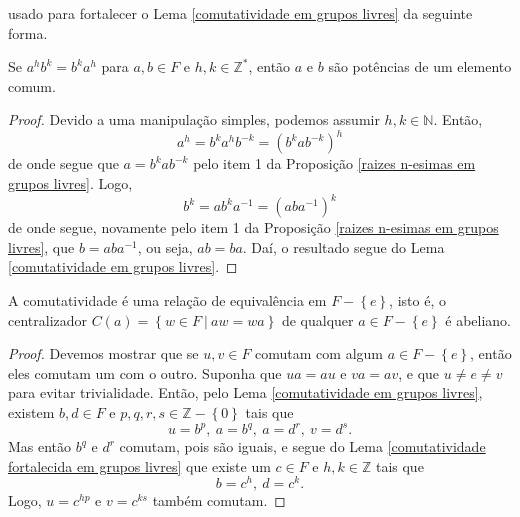     	usado para fortalecer o Lema \ref{comutatividade em grupos livres} da seguinte forma.
    	\begin{lemma}
    	\label{comutatividade fortalecida em grupos livres}
    		Se $a^hb^k = b^ka^h$ para $a,b\in F$ e $h,k\in\mathbb{Z}^\ast$, então $a$ e $b$ são potências 
    		de um elemento comum.
    	\end{lemma}
    	\begin{proof}
    		Devido a uma manipulação simples, podemos assumir $h,k\in\mathbb{N}$. Então,
    		\begin{equation*}
    		    a^h = b^ka^hb^{-k} = (b^kab^{-k})^h
    		\end{equation*}
    		de onde segue que $a = b^kab^{-k}$ pelo item 1 da 
    		Proposição \ref{raizes n-esimas em grupos livres}. Logo,
    		\begin{equation*}
    		    b^k = ab^ka^{-1} = (aba^{-1})^k
    		\end{equation*}
    		de onde segue, novamente pelo item 1 da 
    		Proposição \ref{raizes n-esimas em grupos livres}, que $b = aba^{-1}$, ou seja, $ab = ba$. 
    		Daí, o resultado segue do Lema \ref{comutatividade em grupos livres}.
    	\end{proof}
    	\begin{prop}
    	\label{comutatividade e relacao de equivalencia em grupos livres}
    		A comutatividade é uma relação de equivalência em $F - \left\{ e \right\}$, isto é, o 
    		centralizador $C(a) = \left\{ w\in F \ \vert \ aw = wa \right\}$ de qualquer 
    		$a\in F - \left\{e\right\}$ é abeliano.
    	\end{prop}
    	\begin{proof}
    		Devemos mostrar que se $u,v\in F$ comutam com algum $a\in F - \left\{ e \right\}$, então 
    		eles comutam um com o outro. Suponha que $ua=au$ e $va = av$, e que $u\neq e\neq v$ para evitar
    		trivialidade. Então, pelo Lema \ref{comutatividade em grupos livres}, existem $b,d\in F$ e
    		$p,q,r,s\in\mathbb{Z} - \left\{0\right\}$ tais que 
    		\begin{equation*}
    		    u = b^p, \ a = b^q, \ a = d^r, \ v = d^s.
    		\end{equation*}
    		Mas então $b^q$ e $d^r$ comutam, pois são iguais, e segue do 
    		Lema \ref{comutatividade fortalecida em grupos livres} que existe um $c\in F$ e 
    		$h,k\in\mathbb{Z}$ tais que
    		\begin{equation*}
    		    b = c^h, \ d = c^k.
    		\end{equation*}
    		Logo, $u = c^{hp}$ e $v = c^{ks}$ também comutam.
    	\end{proof}
